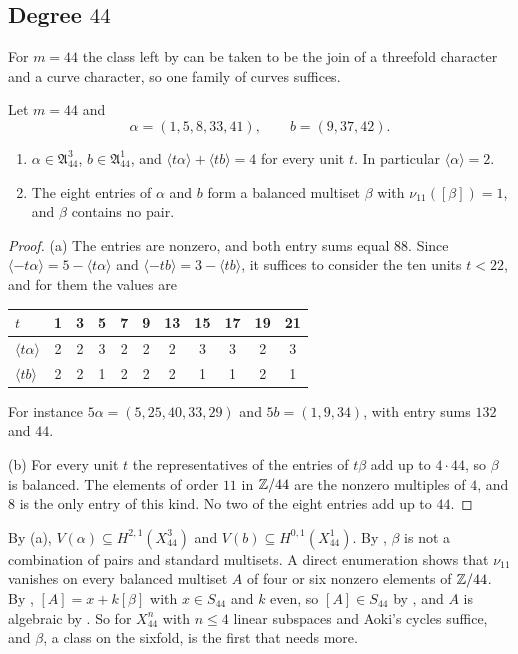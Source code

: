 \subsection{Degree \texorpdfstring{$44$}{44}}\label{ssec:degree44}
For $m=44$ the class left by  can be taken to be the join of
a threefold character and a curve character, so one family of curves
suffices.

\begin{lemma}\label{lem:char44}
Let $m=44$ and
\[
  \alpha=(1,5,8,33,41),\qquad b=(9,37,42).
\]
\begin{enumerate}[label=\textup{(\alph*)}]
\item $\alpha\in\mathfrak A^{3}_{44}$, $b\in\mathfrak A^{1}_{44}$, and
$\langle t\alpha\rangle+\langle tb\rangle=4$ for every unit $t$. In
particular $\langle\alpha\rangle=2$.
\item The eight entries of $\alpha$ and $b$ form a balanced multiset $\beta$
with $\nu_{11}([\beta])=1$, and $\beta$ contains no pair.
\end{enumerate}
\end{lemma}

\begin{proof}
(a) The entries are nonzero, and both entry sums equal $88$. Since
$\langle-t\alpha\rangle=5-\langle t\alpha\rangle$ and $\langle-tb\rangle=
3-\langle tb\rangle$, it suffices to consider the ten units $t<22$, and for
them the values are
\begin{center}
\small
\begin{tabular}{l*{10}{c}}
\toprule
$t$ & 1 & 3 & 5 & 7 & 9 & 13 & 15 & 17 & 19 & 21\\
\midrule
$\langle t\alpha\rangle$ & 2&2&3&2&2&2&3&3&2&3\\
$\langle tb\rangle$ & 2&2&1&2&2&2&1&1&2&1\\
\bottomrule
\end{tabular}
\end{center}
For instance $5\alpha=(5,25,40,33,29)$ and $5b=(1,9,34)$, with entry sums
$132$ and $44$.

(b) For every unit $t$ the representatives of the entries of $t\beta$ add up
to $4\cdot44$, so $\beta$ is balanced. The elements of order $11$ in
$\mathbb{Z}/44$ are the nonzero multiples of $4$, and $8$ is the only entry of this
kind. No two of the eight entries add up to $44$.
\end{proof}

By (a), $V(\alpha)\subseteq H^{2,1}(X^{3}_{44})$ and $V(b)\subseteq
H^{0,1}(X^{1}_{44})$. By , $\beta$ is not a combination of pairs
and standard multisets. A direct enumeration shows that $\nu_{11}$ vanishes
on every balanced multiset $A$ of four or six nonzero elements of $\mathbb{Z}/44$.
By , $[A]=x+k[\beta]$ with $x\in S_{44}$ and $k$ even, so
$[A]\in S_{44}$ by , and $A$ is algebraic by
. So for $X^{n}_{44}$ with $n\le4$ linear subspaces and
Aoki's cycles suffice, and $\beta$, a class on the sixfold, is the first that
needs more.

